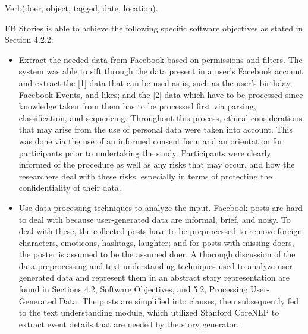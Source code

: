 \begin{center} Verb(doer, object, tagged, date, location). \end{center}

FB Stories is able to achieve the following specific software objectives as stated in Section 4.2.2:
\begin{itemize}
	\item Extract the needed data from Facebook based on permissions and filters. \newline\newline
	The system was able to sift through the data present in a user's Facebook account and extract the [1] data that can be used as is, such as the user's birthday, Facebook Events, and likes; and the [2] data which have to be processed since knowledge taken from them has to be processed first via parsing, classification, and sequencing. \newline\newline
	Throughout this process, ethical considerations that may arise from the use of personal data were taken into account. This was done via the use of an informed consent form and an orientation for participants prior to undertaking the study. Participants were clearly informed of the procedure as well as any risks that may occur, and how the researchers deal with these risks, especially in terms of protecting the confidentiality of their data. \newline\newline
	
	\item Use data processing techniques to analyze the input. \newline\newline
	Facebook posts are hard to deal with because user-generated data are informal, brief, and noisy. To deal with these, the collected posts have to be preprocessed to remove foreign characters, emoticons, hashtags, laughter; and for posts with missing doers, the poster is assumed to be the assumed doer. A thorough discussion of the data preprocessing and text understanding techniques used to analyze user-generated data and represent them in an abstract story representation are found in Sections 4.2, Software Objectives, and 5.2, Processing User-Generated Data. The posts are simplified into clauses, then subsequently fed to the text understanding module, which utilized Stanford CoreNLP to extract event details that are needed by the story generator. \newline\newline
	

\end{itemize}
